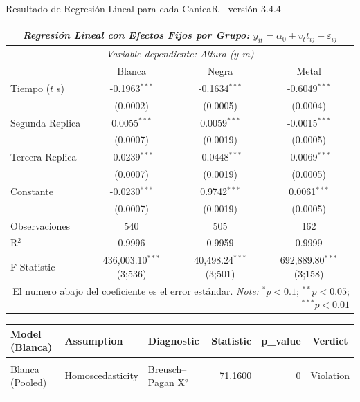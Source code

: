 \documentclass[12pt,a4paper]{config/myConfig}
\newcommand{\Rcode}{R - versión 3.4.4}
\begin{document}
\begin{TableLab}{Resultado de Regresión Lineal para cada Canica}{\Rcode}{}
\begin{tabular}{lccc}
\hline\hline
\multicolumn{4}{c}{\textit{Regresión Lineal con Efectos Fijos por Grupo: } $y_{it} = \alpha_0 + v_t t_{ij} + \varepsilon_{ij}$}\\
\hline\hline
\multicolumn{4}{c}{\textit{Variable dependiente: Altura ($y$ m)}}\\
\hline
 & Blanca & Negra & Metal \\
\hline
Tiempo ($t$ s) 
  & -0.1963$^{***}$ & -0.1634$^{***}$ & -0.6049$^{***}$ \\
  & (0.0002) & (0.0005) & (0.0004) \\

Segunda Replica 
  & 0.0055$^{***}$ & 0.0059$^{***}$ & -0.0015$^{***}$ \\
  & (0.0007) & (0.0019) & (0.0005) \\

Tercera Replica 
  & -0.0239$^{***}$ & -0.0448$^{***}$ & -0.0069$^{***}$ \\
  & (0.0007) & (0.0019) & (0.0005) \\

Constante  
  & -0.0230$^{***}$ & 0.9742$^{***}$ & 0.0061$^{***}$ \\
  & (0.0007) & (0.0019) & (0.0005) \\

\hline
Observaciones 
  & 540 & 505 & 162 \\

R$^{2}$ 
  & 0.9996 & 0.9959 & 0.9999 \\

F Statistic 
  & 436,003.10$^{***}$ (3;536) 
  & 40,498.24$^{***}$ (3;501) 
  & 692,889.80$^{***}$ (3;158) \\
\hline\hline
\multicolumn{4}{r}{El numero abajo del coeficiente es el error estándar.  \textit{Note:} $^{*}p<0.1$; $^{**}p<0.05$; $^{***}p<0.01$}
\end{tabular}    
\begin{tabular}[t]{lllrrc}
\toprule
Model (Blanca) & Assumption & Diagnostic & Statistic & p\_value & Verdict\\
\midrule
\cellcolor{gray!10}{Blanca (Pooled)} & \cellcolor{gray!10}{Normality} & \cellcolor{gray!10}{Shapiro–Wilk W} & \cellcolor{gray!10}{0.9569} & \cellcolor{gray!10}{0} & \cellcolor{gray!10}{Violation}\\
Blanca (Pooled) & Homoscedasticity & Breusch–Pagan X² & 71.1600 & 0 & Violation\\
\cellcolor{gray!10}{Blanca (Pooled)} & \cellcolor{gray!10}{No Autocorrelation} & \cellcolor{gray!10}{Durbin–Watson D} & \cellcolor{gray!10}{0.1052} & \cellcolor{gray!10}{0} & \cellcolor{gray!10}{Violation}\\
\bottomrule
\end{tabular}


\end{TableLab}
\end{document}
